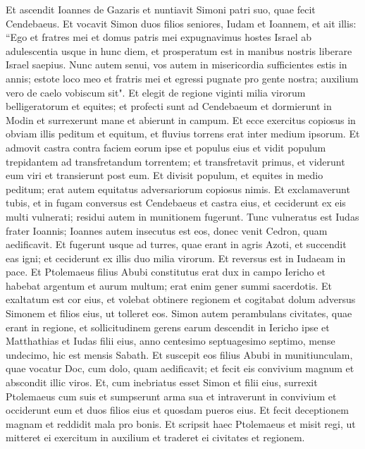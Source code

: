 \begin{biblechapter}  
\verse Et ascendit Ioannes de Gazaris et nuntiavit Simoni patri suo, quae fecit Cendebaeus. 
\verse Et vocavit Simon duos filios seniores, Iudam et Ioannem, et ait illis: “Ego et fratres mei et domus patris mei expugnavimus hostes Israel ab adulescentia usque in hunc diem, et prosperatum est in manibus nostris liberare Israel saepius. 
\verse Nunc autem senui, vos autem in misericordia sufficientes estis in annis; estote loco meo et fratris mei et egressi pugnate pro gente nostra; auxilium vero de caelo vobiscum sit". 
\verse Et elegit de regione viginti milia virorum belligeratorum et equites; et profecti sunt ad Cendebaeum et dormierunt in Modin 
\verse et surrexerunt mane et abierunt in campum. Et ecce exercitus copiosus in obviam illis peditum et equitum, et fluvius torrens erat inter medium ipsorum. 
\verse Et admovit castra contra faciem eorum ipse et populus eius et vidit populum trepidantem ad transfretandum torrentem; et transfretavit primus, et viderunt eum viri et transierunt post eum. 
\verse Et divisit populum, et equites in medio peditum; erat autem equitatus adversariorum copiosus nimis. 
\verse Et exclamaverunt tubis, et in fugam conversus est Cendebaeus et castra eius, et ceciderunt ex eis multi vulnerati; residui autem in munitionem fugerunt. 
\verse Tunc vulneratus est Iudas frater Ioannis; Ioannes autem insecutus est eos, donec venit Cedron, quam aedificavit.  
\verse Et fugerunt usque ad turres, quae erant in agris Azoti, et succendit eas igni; et ceciderunt ex illis duo milia virorum. Et reversus est in Iudaeam in pace. 
\verse Et Ptolemaeus filius Abubi constitutus erat dux in campo Iericho et habebat argentum et aurum multum; 
\verse erat enim gener summi sacerdotis. 
\verse Et exaltatum est cor eius, et volebat obtinere regionem et cogitabat dolum adversus Simonem et filios eius, ut tolleret eos. 
\verse Simon autem perambulans civitates, quae erant in regione, et sollicitudinem gerens earum descendit in Iericho ipse et Matthathias et Iudas filii eius, anno centesimo septuagesimo septimo, mense undecimo, hic est mensis Sabath. 
\verse Et suscepit eos filius Abubi in munitiunculam, quae vocatur Doc, cum dolo, quam aedificavit; et fecit eis convivium magnum et abscondit illic viros. 
\verse Et, cum inebriatus esset Simon et filii eius, surrexit Ptolemaeus cum suis et sumpserunt arma sua et intraverunt in convivium et occiderunt eum et duos filios eius et quosdam pueros eius. 
\verse Et fecit deceptionem magnam et reddidit mala pro bonis. 
\verse Et scripsit haec Ptolemaeus et misit regi, ut mitteret ei exercitum in auxilium et traderet ei civitates et regionem. 

\end{biblechapter}
